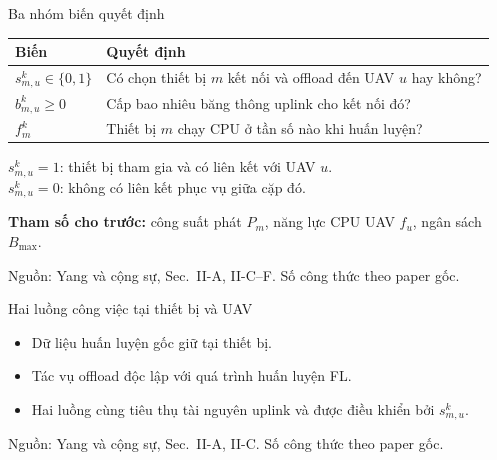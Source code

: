 \documentclass[10pt,aspectratio=43]{beamer}
\newcommand{\source}[1]{\par\vfill{\fontsize{5.8}{7}\selectfont\color{Muted}Nguồn: #1\par}}
\newcommand{\paperref}[1]{\source{Yang và cộng sự, Sec.~#1. Số công thức theo paper gốc.}}
\begin{document}
\begin{frame}[t]{Ba nhóm biến quyết định}
\relax
\renewcommand{\arraystretch}{1.65}
\begin{tabularx}{\textwidth}{@{}p{2cm}Y@{}}
\toprule
\textbf{Biến} & \textbf{Quyết định}\\
\midrule
$s_{m,u}^k\in\{0,1\}$ & Có chọn thiết bị $m$ kết nối và offload đến UAV $u$ hay không?\\
$b_{m,u}^k\geq0$ & Cấp bao nhiêu băng thông uplink cho kết nối đó?\\
$f_m^k$ & Thiết bị $m$ chạy CPU ở tần số nào khi huấn luyện?\\
\bottomrule
\end{tabularx}
\par\bigskip
$s_{m,u}^k=1$: thiết bị tham gia và có liên kết với UAV $u$.\\
$s_{m,u}^k=0$: không có liên kết phục vụ giữa cặp đó.
\par\medskip
\textbf{Tham số cho trước:} công suất phát $P_m$, năng lực CPU UAV $f_u$, ngân sách $B_{\max}$.
\paperref{II-A, II-C--F}
\end{frame}

\begin{frame}[t]{Hai luồng công việc tại thiết bị và UAV}
\relax
\centering
{}
\par\bigskip\raggedright
\begin{itemize}
\item Dữ liệu huấn luyện gốc giữ tại thiết bị.
\item Tác vụ offload độc lập với quá trình huấn luyện FL.
\item Hai luồng cùng tiêu thụ tài nguyên uplink và được điều khiển bởi $s_{m,u}^k$.
\end{itemize}
\paperref{II-A, II-C}
\end{frame}
\end{document}
